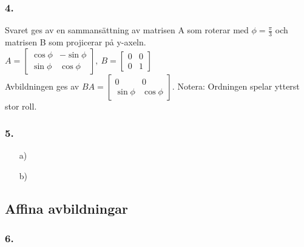 \documentclass{article}
\begin{document}
\subsubsection*{4.}
Svaret ges av en sammansättning av matrisen A som roterar med $\phi=\frac{\pi}{3}$ och matrisen B som projicerar på y-axeln.\\ $A=\begin{bmatrix}\cos{\phi}&-\sin{\phi}\\\sin{\phi}&\cos{\phi}\end{bmatrix},\ B=\begin{bmatrix}0&0\\0&1\end{bmatrix}$ \\ Avbildningen ges av $BA=\begin{bmatrix}0&0\\\sin{\phi}&\cos{\phi}\end{bmatrix}$. Notera: Ordningen spelar ytterst stor roll.

\subsubsection*{5.}
\begin{itemize}
	\item[a) ] 
	\item[b) ] 
\end{itemize}

\subsection*{Affina avbildningar}
\subsubsection*{6.}
\end{document}
